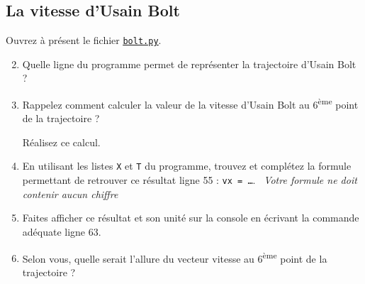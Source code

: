 \documentclass[12pt]{article}
\begin{document}
\subsection{La vitesse d'Usain Bolt}
Ouvrez à présent le fichier  \href{https://github.com/formationPythonPC/formation20-21/tree/master/activites-2nde/3-tp-sports/bolt.py}{\underline{\texttt{bolt.py}}}.
\begin{enumerate}
 \setcounter{enumi}{1}
 
 \item \app Quelle ligne du programme permet de représenter la trajectoire d'Usain Bolt ?
 
  \item \ar \rea Rappelez comment calculer la valeur de la vitesse d'Usain Bolt au 6\textsuperscript{ème} point de la trajectoire ? 
 
 Réalisez ce calcul.  
 \cpdepce

 \begin{center}
 \end{center}
 
 
 \medskip
 
 \item \app \com En utilisant les listes \texttt{X} et \texttt{T} du programme, trouvez et complétez la formule permettant de retrouver ce résultat ligne 55 : \texttt{vx = \ldots}. \hspace{1cm}\danger\ \textsl{Votre formule ne doit contenir aucun chiffre} \danger\hspace{1cm}
 
 \cpdepce

 
 
 
 
 
 \medskip
 
 \item \rea\com Faites afficher ce résultat et son unité sur la console en écrivant la commande adéquate ligne 63. 
 

 \item \ar Selon vous, quelle serait l'allure du vecteur vitesse au 6\textsuperscript{ème} point de la trajectoire ?
 

\end{enumerate}
\end{document}

